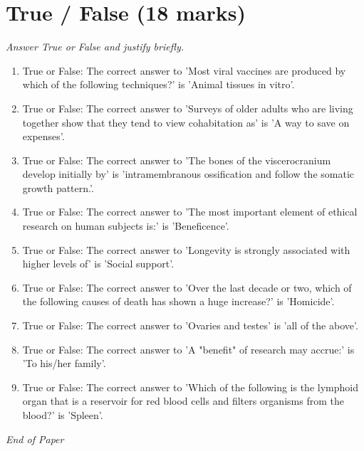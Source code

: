 \documentclass[12pt]{article}
\begin{document}
\section*{True / False (18 marks)}
\textit{Answer True or False and justify briefly.}
\begin{enumerate}[label=\arabic*.]
\item True or False: The correct answer to 'Most viral vaccines are produced by which of the following techniques?' is 'Animal tissues in vitro'.
\item True or False: The correct answer to 'Surveys of older adults who are living together show that they tend to view cohabitation as' is 'A way to save on expenses'.
\item True or False: The correct answer to 'The bones of the viscerocranium develop initially by' is 'intramembranous ossification and follow the somatic growth pattern.'.
\item True or False: The correct answer to 'The most important element of ethical research on human subjects is:' is 'Beneficence'.
\item True or False: The correct answer to 'Longevity is strongly associated with higher levels of' is 'Social support'.
\item True or False: The correct answer to 'Over the last decade or two, which of the following causes of death has shown a huge increase?' is 'Homicide'.
\item True or False: The correct answer to 'Ovaries and testes' is 'all of the above'.
\item True or False: The correct answer to 'A "benefit" of research may accrue:' is 'To his/her family'.
\item True or False: The correct answer to 'Which of the following is the lymphoid organ that is a reservoir for red blood cells and filters organisms from the blood?' is 'Spleen'.
\end{enumerate}

\vfill
\noindent\textit{End of Paper}
\end{document}
